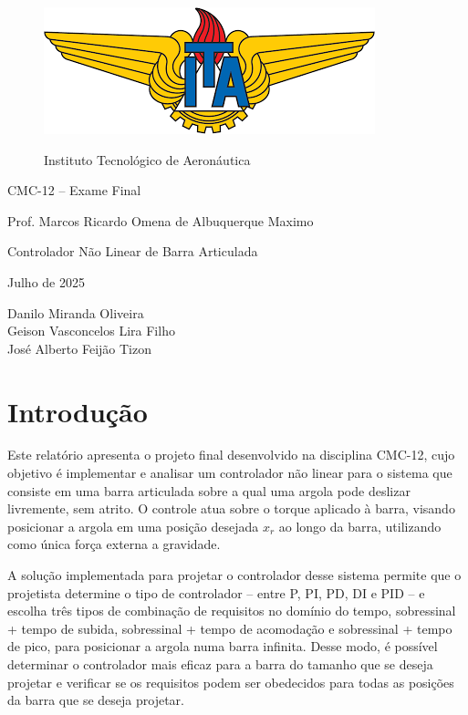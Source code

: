 \documentclass[a4paper, 12pt]{article} %
\begin{document}
 
\thispagestyle{empty} 
\vspace*{2.15cm}

\begin{figure}[htb]
    \centering
    \includegraphics[scale=0.52]{images/ITA.png}
    
    \large Instituto Tecnológico de Aeronáutica
\end{figure}

\begin{center}
    \huge{CMC-12 – Exame Final} 
    
    \vspace{.5cm}
    \large Prof. Marcos Ricardo Omena de Albuquerque Maximo
    
    \vspace{1cm}
    \Huge Controlador Não Linear de Barra Articulada
    
    \vspace{.5cm}
    \Large Julho de 2025
    
    \vspace{.15cm}
    \large
    Danilo Miranda Oliveira \\
    Geison Vasconcelos Lira Filho \\
    José Alberto Feijão Tizon \\
\end{center}

\newpage
\setcounter{page}{1}


\section{Introdução}

Este relatório apresenta o projeto final desenvolvido na disciplina CMC-12, cujo objetivo é implementar e analisar um controlador não linear para o sistema que consiste em uma barra articulada sobre a qual uma argola pode deslizar livremente, sem atrito. O controle atua sobre o torque aplicado à barra, visando posicionar a argola em uma posição desejada \( x_r \) ao longo da barra, utilizando como única força externa a gravidade.

A solução implementada para projetar o controlador desse sistema permite que o projetista determine o tipo de controlador -- entre P, PI, PD, DI e PID -- e escolha três tipos de combinação de requisitos no domínio do tempo, sobressinal + tempo de subida, sobressinal + tempo de acomodação e sobressinal + tempo de pico, para posicionar a argola numa barra infinita. Desse modo, é possível determinar o controlador mais eficaz para a barra do tamanho que se deseja projetar e verificar se os requisitos podem ser obedecidos para todas as posições da barra que se deseja projetar.
\end{document}
